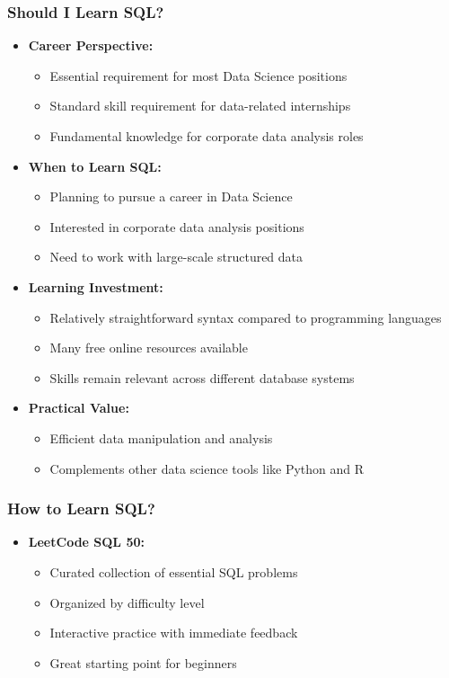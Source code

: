 \documentclass[10pt]{beamer}
\begin{document}
\begin{frame}
    \frametitle{Should I Learn SQL?}
    \begin{itemize}
        \item \textbf{Career Perspective:}
            \begin{itemize}
                \item Essential requirement for most Data Science positions
                \item Standard skill requirement for data-related internships
                \item Fundamental knowledge for corporate data analysis roles
            \end{itemize}
        \item \textbf{When to Learn SQL:}
            \begin{itemize}
                \item Planning to pursue a career in Data Science
                \item Interested in corporate data analysis positions
                \item Need to work with large-scale structured data
            \end{itemize}
        \item \textbf{Learning Investment:}
            \begin{itemize}
                \item Relatively straightforward syntax compared to programming languages
                \item Many free online resources available
                \item Skills remain relevant across different database systems
            \end{itemize}
        \item \textbf{Practical Value:}
            \begin{itemize}
                \item Efficient data manipulation and analysis
                \item Complements other data science tools like Python and R
            \end{itemize}
    \end{itemize}
\end{frame}

\begin{frame}
    \frametitle{How to Learn SQL?}
    \begin{itemize}
        \item \textbf{LeetCode SQL 50:}
            \begin{itemize}
                \item Curated collection of essential SQL problems
                \item Organized by difficulty level
                \item Interactive practice with immediate feedback
                \item Great starting point for beginners
            \end{itemize}
    \end{itemize}
\end{frame}
\end{document}
